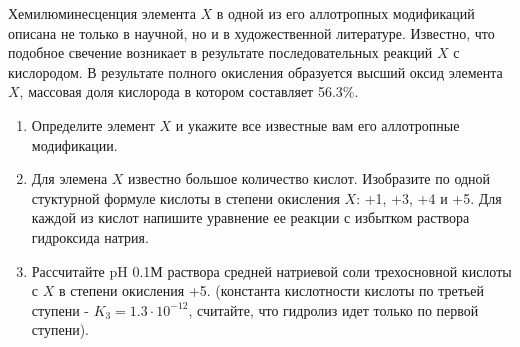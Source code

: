 
Хемилюминесценция элемента $X$ в одной из его аллотропных модификаций  описана не только в научной, но и в 
художественной литературе. Известно, что подобное свечение возникает в результате последовательных реакций $X$ с 
кислородом. В результате полного окисления образуется высший оксид элемента $X$, массовая доля кислорода в котором 
составляет 56.3\%. 

\begin{enumerate}
    \item Определите элемент $X$ и укажите все известные вам его аллотропные модификации. 
    \item Для элемена $X$ известно большое количество кислот. Изобразите по одной стуктурной формуле кислоты в 
    степени окисления $X$: +1, +3, +4 и +5. Для каждой из кислот напишите уравнение ее реакции с избытком раствора 
    гидроксида натрия.
    \item Рассчитайте pH 0.1М раствора средней натриевой соли трехосновной кислоты с $X$ в степени окисления +5. 
    (константа кислотности  кислоты по третьей ступени - $K_3=1.3 \cdot 10^{-12}$, считайте, что гидролиз идет только по первой ступени).   
\end{enumerate}

